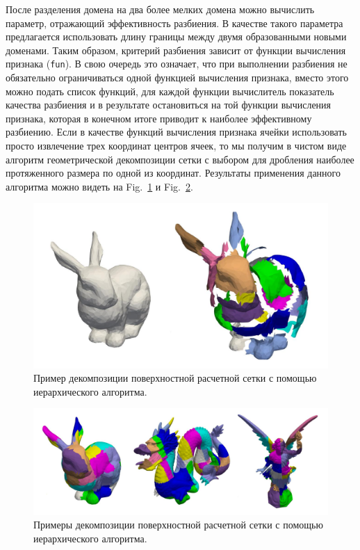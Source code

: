 \documentclass[
11pt,%
tightenlines,%
twoside,%
onecolumn,%
nofloats,%
nobibnotes,%
nofootinbib,%
superscriptaddress,%
noshowpacs,%
centertags]%
{revtex4}
\begin{document}
После разделения домена на два более мелких домена можно вычислить параметр, отражающий эффективность разбиения.
В качестве такого параметра предлагается использовать длину границы между двумя образованными новыми доменами.
Таким образом, критерий разбиения зависит от функции вычисления признака (\texttt{fun}).
В свою очередь это означает, что при выполнении разбиения не обязательно ограничиваться одной функцией вычисления признака, вместо этого можно подать список функций, для каждой функции вычислитель показатель качества разбиения и в результате остановиться на той функции вычисления признака, которая в конечном итоге приводит к наиболее эффективному разбиению.
Если в качестве функций вычисления признака ячейки использовать просто извлечение трех координат центров ячеек, то мы получим в чистом виде алгоритм геометрической декомпозиции сетки с выбором для дробления наиболее протяженного размера по одной из координат.
Результаты применения данного алгоритма можно видеть на Fig.~\ref{fig:03-explode-bunny} и Fig.~\ref{fig:03-hierarch}.

\begin{figure}[h]
\includegraphics[width=1.0\textwidth]{pics/03-explode-bunny.pdf}
\caption{Пример декомпозиции поверхностной расчетной сетки с помощью иерархического алгоритма.}\label{fig:03-explode-bunny}
\end{figure}

\begin{figure}[h]
\includegraphics[width=1.0\textwidth]{pics/03-hierarch.pdf}
\caption{Примеры декомпозиции поверхностной расчетной сетки с помощью иерархического алгоритма.}\label{fig:03-hierarch}
\end{figure}
\end{document}
